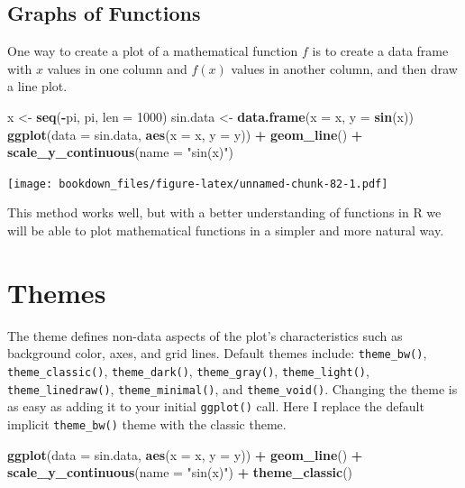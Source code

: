 \documentclass[]{krantz}
\makeatletter
\newenvironment{Shaded}{\begin{snugshade}}{\end{snugshade}}
\newcommand{\KeywordTok}[1]{\textcolor[rgb]{0.27,0.27,0.27}{\textbf{#1}}}
\newcommand{\DataTypeTok}[1]{\textcolor[rgb]{0.27,0.27,0.27}{#1}}
\newcommand{\DecValTok}[1]{\textcolor[rgb]{0.06,0.06,0.06}{#1}}
\newcommand{\StringTok}[1]{\textcolor[rgb]{0.5,0.5,0.5}{#1}}
\newcommand{\OperatorTok}[1]{\textcolor[rgb]{0.43,0.43,0.43}{\textbf{#1}}}
\newcommand{\NormalTok}[1]{#1}
\newenvironment{kframe}{%
\medskip{}
\setlength{\fboxsep}{.8em}
 \def\at@end@of@kframe{}%
 \ifinner\ifhmode%
  \def\at@end@of@kframe{\end{minipage}}%
  \begin{minipage}{\columnwidth}%
 \fi\fi%
 \def\FrameCommand##1{\hskip\@totalleftmargin \hskip-\fboxsep
 \colorbox{shadecolor}{##1}\hskip-\fboxsep
     \hskip-\linewidth \hskip-\@totalleftmargin \hskip\columnwidth}%
 \MakeFramed {\advance\hsize-\width
   \@totalleftmargin\z@ \linewidth\hsize
   \@setminipage}}%
 {\par\unskip\endMakeFramed%
 \at@end@of@kframe}
\renewenvironment{Shaded}{\begin{kframe}}{\end{kframe}}
\makeatother
\begin{document}
\subsection{Graphs of Functions}\label{graphs-of-functions}

One way to create a plot of a mathematical function \(f\) is to create a
data frame with \(x\) values in one column and \(f(x)\) values in
another column, and then draw a line plot.

\begin{Shaded}
\begin{Highlighting}[]
\NormalTok{x <-}\StringTok{ }\KeywordTok{seq}\NormalTok{(}\OperatorTok{-}\NormalTok{pi, pi, }\DataTypeTok{len =} \DecValTok{1000}\NormalTok{)}
\NormalTok{sin.data <-}\StringTok{ }\KeywordTok{data.frame}\NormalTok{(}\DataTypeTok{x =}\NormalTok{ x, }\DataTypeTok{y =} \KeywordTok{sin}\NormalTok{(x))}
\KeywordTok{ggplot}\NormalTok{(}\DataTypeTok{data =}\NormalTok{ sin.data, }\KeywordTok{aes}\NormalTok{(}\DataTypeTok{x =}\NormalTok{ x, }\DataTypeTok{y =}\NormalTok{ y)) }\OperatorTok{+}\StringTok{ }\KeywordTok{geom_line}\NormalTok{() }\OperatorTok{+}\StringTok{ }
\StringTok{    }\KeywordTok{scale_y_continuous}\NormalTok{(}\DataTypeTok{name =} \StringTok{"sin(x)"}\NormalTok{)}
\end{Highlighting}
\end{Shaded}

\texttt{[image: bookdown\_files/figure-latex/unnamed-chunk-82-1.pdf]}

This method works well, but with a better understanding of functions in
R we will be able to plot mathematical functions in a simpler and more
natural way.

\section{Themes}\label{themes}

The theme defines non-data aspects of the plot's characteristics such as
background color, axes, and grid lines. Default themes include:
\texttt{theme\_bw()}, \texttt{theme\_classic()}, \texttt{theme\_dark()},
\texttt{theme\_gray()}, \texttt{theme\_light()},
\texttt{theme\_linedraw()}, \texttt{theme\_minimal()}, and
\texttt{theme\_void()}. Changing the theme is as easy as adding it to
your initial \texttt{ggplot()} call. Here I replace the default implicit
\texttt{theme\_bw()} theme with the classic theme.

\begin{Shaded}
\begin{Highlighting}[]
\KeywordTok{ggplot}\NormalTok{(}\DataTypeTok{data =}\NormalTok{ sin.data, }\KeywordTok{aes}\NormalTok{(}\DataTypeTok{x =}\NormalTok{ x, }\DataTypeTok{y =}\NormalTok{ y)) }\OperatorTok{+}\StringTok{ }\KeywordTok{geom_line}\NormalTok{() }\OperatorTok{+}\StringTok{ }
\StringTok{    }\KeywordTok{scale_y_continuous}\NormalTok{(}\DataTypeTok{name =} \StringTok{"sin(x)"}\NormalTok{) }\OperatorTok{+}
\StringTok{    }\KeywordTok{theme_classic}\NormalTok{()}
\end{Highlighting}
\end{Shaded}
\end{document}
